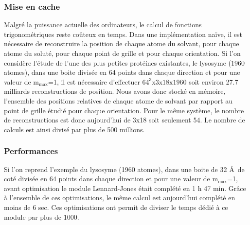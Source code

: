 \subsubsection{Mise en cache}
Malgré la puissance actuelle des ordinateurs, le calcul de fonctions trigonométriques reste coûteux en temps. Dans une implémentation naïve, il est nécessaire de reconstruire la position de chaque atome du solvant, pour chaque atome du soluté, pour chaque point de grille et pour chaque orientation. Si l'on considère l'étude de l'une des plus petites protéines existantes, le lysosyme (1960 atomes), dans une boite divisée en 64 points dans chaque direction et pour une valeur de $\mathrm{m}_\mathrm{max}$=1, il est nécessaire d'effectuer $64^3\mathrm{x}3\mathrm{x}18\mathrm{x}1960$ soit environ 27.7 milliards reconstructions de position. Nous avons donc stocké en mémoire, l'ensemble des positions relatives de chaque atome de solvant par rapport au point de grille étudié pour chaque orientation. Pour le même système, le nombre de reconstructions est donc aujourd'hui de 3x18 soit seulement 54. Le nombre de calculs est ainsi divisé par plus de 500 millions.


\subsubsection{Performances}
Si l'on reprend l'exemple du lysosyme (1960 atomes), dans une boite de 32 \AA\ de coté divisée en 64 points dans chaque direction et pour une valeur de $\mathrm{m}_\mathrm{max}$=1, avant optimisation le module Lennard-Jones était complété en 1 h 47 min. Grâce à l'ensemble de ces optimisations, le même calcul est aujourd'hui complété en moins de 6 sec. Ces optimisations ont permit de diviser le temps dédié à ce module par plus de 1000.

%

%







